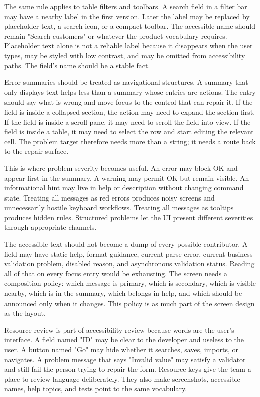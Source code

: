 The same rule applies to table filters and toolbars. A search field in a filter
bar may have a nearby label in the first version. Later the label may be
replaced by placeholder text, a search icon, or a compact toolbar. The
accessible name should remain "Search customers" or whatever the product
vocabulary requires. Placeholder text alone is not a reliable label because it
disappears when the user types, may be styled with low contrast, and may be
omitted from accessibility paths. The field's name should be a stable fact.

Error summaries should be treated as navigational structures. A summary that
only displays text helps less than a summary whose entries are actions. The
entry should say what is wrong and move focus to the control that can repair it.
If the field is inside a collapsed section, the action may need to expand the
section first. If the field is inside a scroll pane, it may need to scroll the
field into view. If the field is inside a table, it may need to select the row
and start editing the relevant cell. The problem target therefore needs more
than a string; it needs a route back to the repair surface.

This is where problem severity becomes useful. An error may block OK and appear
first in the summary. A warning may permit OK but remain visible. An
informational hint may live in help or description without changing command
state. Treating all messages as red errors produces noisy screens and
unnecessarily hostile keyboard workflows. Treating all messages as tooltips
produces hidden rules. Structured problems let the UI present different
severities through appropriate channels.

The accessible text should not become a dump of every possible contributor. A
field may have static help, format guidance, current parse error, current
business validation problem, disabled reason, and asynchronous validation
status. Reading all of that on every focus entry would be exhausting. The
screen needs a composition policy: which message is primary, which is secondary,
which is visible nearby, which is in the summary, which belongs in help, and
which should be announced only when it changes. This policy is as much part of
the screen design as the layout.

Resource review is part of accessibility review because words are the user's
interface. A field named "ID" may be clear to the developer and useless to the
user. A button named "Go" may hide whether it searches, saves, imports, or
navigates. A problem message that says "Invalid value" may satisfy a validator
and still fail the person trying to repair the form. Resource keys give the
team a place to review language deliberately. They also make screenshots,
accessible names, help topics, and tests point to the same vocabulary.

